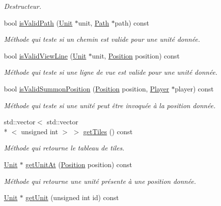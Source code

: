 \begin{DoxyCompactItemize}
\begin{DoxyCompactList}\small\item\em Destructeur. \end{DoxyCompactList}\item 
bool \hyperlink{classMap_a82b16c404e0e9a3f11619a4c040d6f74}{is\+Valid\+Path} (\hyperlink{classUnit}{Unit} $\ast$unit, \hyperlink{classPath}{Path} $\ast$path) const 
\begin{DoxyCompactList}\small\item\em Méthode qui teste si un chemin est valide pour une unité donnée. \end{DoxyCompactList}\item 
bool \hyperlink{classMap_a708c3a1b9b5e0771fedc078c8a22677a}{is\+Valid\+View\+Line} (\hyperlink{classUnit}{Unit} $\ast$unit, \hyperlink{classPosition}{Position} position) const 
\begin{DoxyCompactList}\small\item\em Méthode qui teste si une ligne de vue est valide pour une unité donnée. \end{DoxyCompactList}\item 
bool \hyperlink{classMap_a48877a918e3766b284120918b183b9d4}{is\+Valid\+Summon\+Position} (\hyperlink{classPosition}{Position} position, \hyperlink{classPlayer}{Player} $\ast$player) const 
\begin{DoxyCompactList}\small\item\em Méthode qui teste si une unité peut être invoquée à la position donnée. \end{DoxyCompactList}\item 
std\+::vector$<$ std\+::vector\\*
$<$ unsigned int $>$ $>$ \hyperlink{classMap_a902613cfaf7782f2212b088eccc2f0e7}{get\+Tiles} () const 
\begin{DoxyCompactList}\small\item\em Méthode qui retourne le tableau de tiles. \end{DoxyCompactList}\item 
\hyperlink{classUnit}{Unit} $\ast$ \hyperlink{classMap_a947916f15873cfad436bd8c156d8bcbf}{get\+Unit\+At} (\hyperlink{classPosition}{Position} position) const 
\begin{DoxyCompactList}\small\item\em Méthode qui retourne une unité présente à une position donnée. \end{DoxyCompactList}\item 
\hyperlink{classUnit}{Unit} $\ast$ \hyperlink{classMap_a5e9e5a63b3ffd5a7051d86cfb2ae2925}{get\+Unit} (unsigned int id) const 

\end{DoxyCompactItemize}
